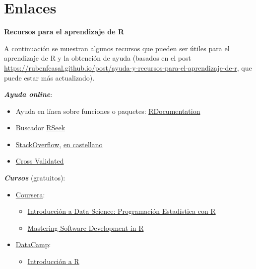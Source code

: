 \documentclass[
]{book}
\providecommand{\tightlist}{%
  \setlength{\itemsep}{0pt}\setlength{\parskip}{0pt}}
\theoremstyle{break}
\theoremstyle{definition}
\theoremstyle{definition}
\theoremstyle{definition}
\theoremstyle{remark}
\begin{document}
\hypertarget{appendix-apendices}{%
\appendix}


\hypertarget{links}{%
\chapter{Enlaces}\label{links}}

\textbf{Recursos para el aprendizaje de R}

A continuación se muestran algunos recursos que pueden ser útiles para el aprendizaje de R y la obtención de ayuda
(basados en el post \url{https://rubenfcasal.github.io/post/ayuda-y-recursos-para-el-aprendizaje-de-r},
que puede estar más actualizado).

\textbf{\emph{Ayuda online}}:

\begin{itemize}
\item
  Ayuda en línea sobre funciones o paquetes: \href{https://www.rdocumentation.org/}{RDocumentation}
\item
  Buscador \href{http://rseek.org/}{RSeek}
\item
  \href{http://stackoverflow.com/questions/tagged/r}{StackOverflow}, \href{https://es.stackoverflow.com/questions/tagged/r}{en castellano}
\item
  \href{https://stats.stackexchange.com}{Cross Validated}
\end{itemize}

\textbf{\emph{Cursos}} (gratuitos):

\begin{itemize}
\item
  \href{https://www.coursera.org/}{Coursera}:

  \begin{itemize}
  \item
    \href{https://www.coursera.org/learn/intro-data-science-programacion-estadistica-r}{Introducción a Data Science: Programación Estadística con R}
  \item
    \href{https://www.coursera.org/specializations/r}{Mastering Software Development in R}
  \end{itemize}
\end{itemize}

\begin{itemize}
\item
  \href{https://www.datacamp.com/courses}{DataCamp}:

  \begin{itemize}
  \tightlist
  \item
    \href{https://www.datacamp.com/courses/introduccion-a-r/}{Introducción a R}
  \end{itemize}
\end{itemize}
\end{document}
